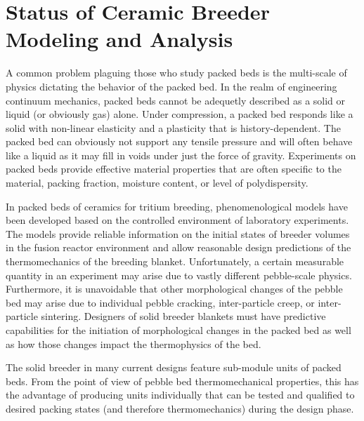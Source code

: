 \chapter{Status of Ceramic Breeder Modeling and Analysis}
A common problem plaguing those who study packed beds is the multi-scale of physics dictating the behavior of the packed bed. In the realm of engineering continuum mechanics, packed beds cannot be adequetly described as a solid or liquid (or obviously gas) alone. Under compression, a packed bed responds like a solid with non-linear elasticity and a plasticity that is history-dependent. The packed bed can obviously not support any tensile pressure and will often behave like a liquid as it may fill in voids under just the force of gravity. Experiments on packed beds provide effective material properties that are often specific to the material, packing fraction, moisture content, or level of polydispersity.

In packed beds of ceramics for tritium breeding, phenomenological models have been developed based on the controlled environment of laboratory experiments. The models provide reliable information on the initial states of breeder volumes in the fusion reactor environment and allow reasonable design predictions of the thermomechanics of the breeding blanket. Unfortunately, a certain measurable quantity in an experiment may arise due to vastly different pebble-scale physics. Furthermore, it is unavoidable that other morphological changes of the pebble bed may arise due to individual pebble cracking, inter-particle creep, or inter-particle sintering. Designers of solid breeder blankets must have predictive capabilities for the initiation of morphological changes in the packed bed as well as how those changes impact the thermophysics of the bed.

The solid breeder in many current designs feature sub-module units of packed beds. From the point of view of pebble bed thermomechanical properties, this has the advantage of producing units individually that can be tested and qualified to desired packing states (and therefore thermomechanics) during the design phase. 



